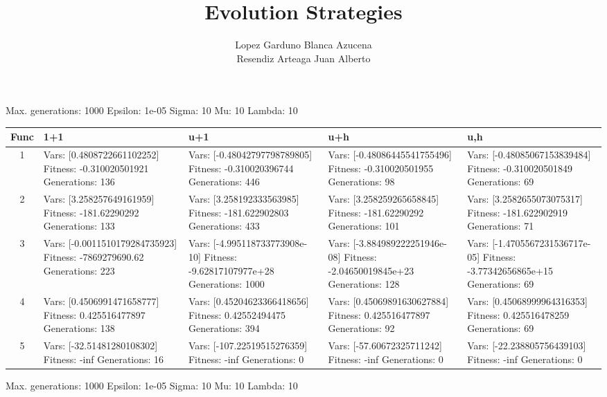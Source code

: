 \documentclass[landscape,11pt]{article}
\begin{document}
\title{Evolution Strategies}
 \author{Lopez Garduno Blanca Azucena\\ Resendiz Arteaga Juan Alberto}
 \maketitle
Max. generations: 1000 Epsilon: 1e-05 Sigma: 10 Mu: 10 Lambda: 10 \\
\begin{tabular}{|c|p{5.4cm}|p{5.4cm}|p{5.4cm}|p{5.4cm}|}
 \hline
 Func & 1+1 & u+1 & u+h & u,h \\ 
 \hline
 1 & Vars: [0.4808722661102252] Fitness: -0.310020501921 Generations: 136 & Vars: [-0.48042797798789805] Fitness: -0.310020396744 Generations: 446 & Vars: [-0.48086445541755496] Fitness: -0.310020501955 Generations: 98 & Vars: [-0.48085067153839484] Fitness: -0.310020501849 Generations: 69 \\
 \hline 
 2 & Vars: [3.258257649161959] Fitness: -181.62290292 Generations: 133 & Vars: [3.258192333563985] Fitness: -181.622902803 Generations: 433 & Vars: [3.258259265658845] Fitness: -181.62290292 Generations: 101 & Vars: [3.2582655073075317] Fitness: -181.622902919 Generations: 71 \\
 \hline 
 3 & Vars: [-0.0011510179284735923] Fitness: -7869279690.62 Generations: 223 & Vars: [-4.995118733773908e-10] Fitness: -9.62817107977e+28 Generations: 1000 & Vars: [-3.884989222251946e-08] Fitness: -2.04650019845e+23 Generations: 128 & Vars: [-1.4705567231536717e-05] Fitness: -3.77342656865e+15 Generations: 69 \\
 \hline 
 4 & Vars: [0.4506991471658777] Fitness: 0.425516477897 Generations: 138 & Vars: [0.45204623366418656] Fitness: 0.42552494475 Generations: 394 & Vars: [0.45069891630627884] Fitness: 0.425516477897 Generations: 92 & Vars: [0.45068999964316353] Fitness: 0.425516478259 Generations: 69 \\
 \hline 
 5 & Vars: [-32.51481280108302] Fitness: -inf Generations: 16 & Vars: [-107.22519515276359] Fitness: -inf Generations: 0 & Vars: [-57.60672325711242] Fitness: -inf Generations: 0 & Vars: [-22.238805756439103] Fitness: -inf Generations: 0 \\
 \hline 
\end{tabular}
\newpage
Max. generations: 1000 Epsilon: 1e-05 Sigma: 10 Mu: 10 Lambda: 10 \\
\end{document}
